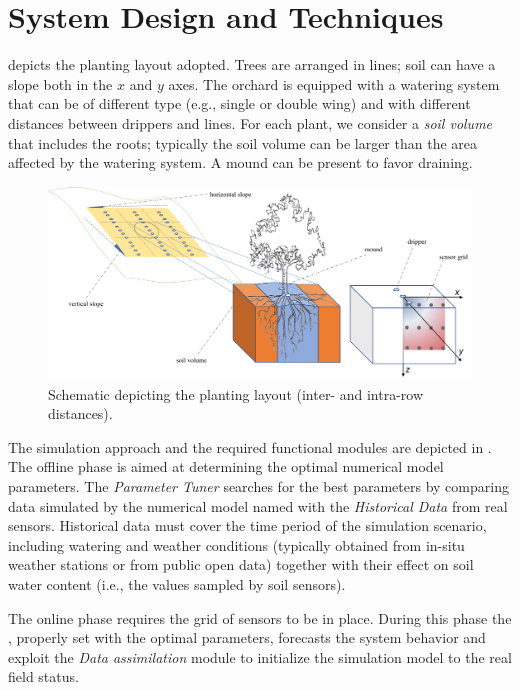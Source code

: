 \section{System Design and Techniques}
  depicts the planting layout adopted.
 Trees are arranged in lines; soil can have a slope both in the $x$ and $y$ axes. The orchard is equipped with a watering system that can be of different type (e.g., single or double wing) and with different distances between drippers and lines. For each plant, we consider a \emph{soil volume} that includes the roots; typically the soil volume can be larger than the area affected by the watering system. A mound can be present to favor draining.
 \begin{figure}[t]
	\centering
	\includegraphics[scale=0.5]{chapters/physics-aware/orchard/img/OverallPlantingLayout3.png}
	\caption{Schematic depicting the planting layout (inter- and intra-row distances).}
	\label{orchard-fig:scheme1}
\end{figure} 


The simulation approach and the required functional modules are depicted in . The offline phase is aimed at determining the optimal numerical model parameters. The \emph{Parameter Tuner} searches for the best parameters by comparing data simulated by the numerical model named \olab{} with the \emph{Historical Data} from real sensors.
Historical data must cover the time period of the simulation scenario, including watering and weather conditions (typically obtained from in-situ weather stations or from public open data) together with their effect on soil water content (i.e., the values sampled by soil sensors). 

The online phase requires the grid of sensors to be in place. During this phase the \olab{}, properly set with the optimal parameters, forecasts the system behavior and exploit the \emph{Data assimilation} module to initialize the simulation model to the real field status.

